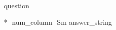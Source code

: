 \begin{question}
    {{ question }}

    \begin{tabular}{ *{ {{-num_column-}} }{S{m{\tabcolsep\relax}}} }
        {{ answer_string }}
    \end{tabular}
\end{question}

